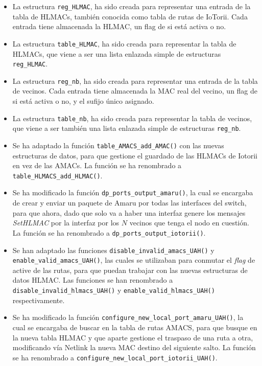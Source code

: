 \begin{itemize}
    \item La estructura \texttt{reg\_HLMAC}, ha sido creada para representar una entrada de la tabla de HLMACs, también conocida como tabla de rutas de IoTorii. Cada entrada tiene almacenada la HLMAC, un flag de si está activa o no.
    \item La estructura \texttt{table\_HLMAC}, ha sido creada para representar la tabla de HLMACs, que viene a ser una lista enlazada simple de estructuras \texttt{reg\_HLMAC}.
    \item La estructura \texttt{reg\_nb}, ha sido creada para representar una entrada de la tabla de vecinos. Cada entrada tiene almacenada la MAC real del vecino, un flag de si está activa o no, y el sufijo único asignado.
    \item La estructura \texttt{table\_nb}, ha sido creada para representar la tabla de vecinos, que viene a ser también una lista enlazada simple de estructuras \texttt{reg\_nb}.
    \item Se ha adaptado la función \texttt{table\_AMACS\_add\_AMAC()} con las nuevas estructuras de datos, para que gestione el guardado de las HLMACs de Iotorii en vez de las AMACs. La función se ha renombrado a \texttt{table\_HLMACS\_add\_HLMAC()}.
    \item Se ha modificado la función \texttt{dp\_ports\_output\_amaru()}, la cual se encargaba de crear y enviar un paquete de Amaru por todas las interfaces del switch, para que ahora, dado que solo va a haber una interfaz genere los mensajes \textit{SetHLMAC} por la interfaz por los $N$ vecinos que tenga el nodo en cuestión. La función se ha renombrado a \texttt{dp\_ports\_output\_iotorii()}.
    \item Se han adaptado las funciones \texttt{disable\_invalid\_amacs\_UAH()} y \texttt{enable\_valid\_amacs\_UAH()}, las cuales se utilizaban para conmutar el \textit{flag} de active de las rutas, para que puedan trabajar con las nuevas estructuras de datos HLMAC. Las funciones se han renombrado a \texttt{disable\_invalid\_hlmacs\_UAH()} y \texttt{enable\_valid\_hlmacs\_UAH()} respectivamente.
    \item Se ha modificado la función \texttt{configure\_new\_local\_port\_amaru\_UAH()}, la cual se encargaba de buscar en la tabla de rutas AMACS, para que busque en la nueva tabla HLMAC y que aparte gestione el traspaso de una ruta a otra, modificando vía Netlink la nueva MAC destino del siguiente salto. La función se ha renombrado a \texttt{configure\_new\_local\_port\_iotorii\_UAH()}.

\end{itemize}
